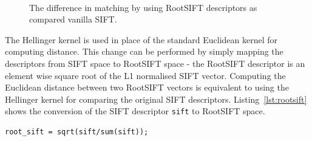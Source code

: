 \documentclass[11pt, onecolumn, a4paper, final]{report} %
\begin{document}
\begin{figure}[h!tb]
\centering 
{}
\\
\caption{The difference in matching by using RootSIFT descriptors as compared vanilla SIFT.}
\label{fig:affinerootaffine}
\end{figure}

The Hellinger kernel is used in place of the standard Euclidean kernel for computing distance. This change can be performed by simply mapping the descriptors from SIFT space to RootSIFT space - the RootSIFT descriptor is an element wise square root of the L1 normalised SIFT vector. Computing the Euclidean distance between two RootSIFT vectors is equivalent to using the Hellinger kernel for comparing the original SIFT descriptors. Listing~\ref{lst:rootsift} shows the conversion of the SIFT descriptor \lstinline!sift! to RootSIFT space.

\linespread{1} %
\lstset{language=Matlab,caption=Mapping of SIFT descriptors to RootSIFT space.,label=lst:rootsift}
\begin{lstlisting}[frame=single]
%% MATLAB
root_sift = sqrt(sift/sum(sift));
\end{lstlisting}
\linespread{2} %
\end{document}
